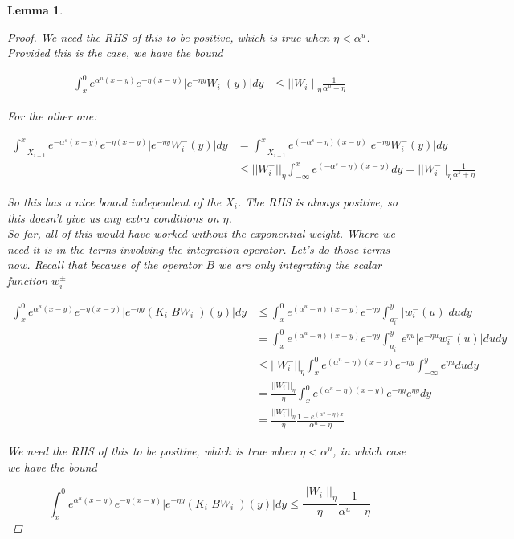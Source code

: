 \documentclass[12pt]{article}
\newtheorem{lemma}{Lemma}
\begin{document}
\begin{lemma}
\begin{proof}
We need the RHS of this to be positive, which is true when $\eta < \alpha^u$. Provided this is the case, we have the bound

\begin{align*}
\int_x^0 e^{\alpha^u (x-y)}e^{-\eta(x-y)}|e^{-\eta y} W_i^-(y)| dy &\leq ||W_i^-||_\eta \frac{1}{\alpha^u - \eta}
\end{align*}

For the other one:

\begin{align*}
\int_{-X_{i-1}}^x e^{-\alpha^s (x-y)}e^{-\eta(x-y)}|e^{-\eta y} W_i^-(y)| dy &= \int_{-X_{i-1}}^x e^{(-\alpha^s - \eta) (x-y)}|e^{-\eta y} W_i^-(y)| dy \\
&\leq ||W_i^-||_\eta \int_{-\infty}^x e^{(-\alpha^s - \eta) (x-y)} dy = ||W_i^-||_\eta \frac{1}{\alpha^s + \eta}
\end{align*}

So this has a nice bound independent of the $X_i$. The RHS is always positive, so this doesn't give us any extra conditions on $\eta$. \\

So far, all of this would have worked without the exponential weight. Where we need it is in the terms involving the integration operator. Let's do those terms now. Recall that because of the operator $B$ we are only integrating the scalar function $w_i^\pm$

\begin{align*}
\int_x^0 e^{\alpha^u (x-y)}e^{-\eta(x-y)}|e^{-\eta y} (K_i^- B W_i^-)(y)| dy &\leq \int_x^0 e^{(\alpha^u - \eta)(x-y)}e^{-\eta y} \int_{a_i^-}^y |w_i^-(u)| du dy \\
&= \int_x^0 e^{(\alpha^u - \eta)(x-y)}e^{-\eta y} \int_{a_i^-}^y e^{\eta u} |e^{-\eta u} w_i^-(u)| du dy \\
&\leq ||W_i^-||_\eta \int_x^0 e^{(\alpha^u - \eta)(x-y)}e^{-\eta y} \int_{-\infty}^y e^{\eta u} du dy \\
&= \frac{||W_i^-||_\eta}{\eta} \int_x^0 e^{(\alpha^u - \eta)(x-y)}e^{-\eta y} e^{\eta y} dy \\
&= \frac{||W_i^-||_\eta}{\eta} \frac{1 - e^{(\alpha^u - \eta)x}}{\alpha^u - \eta} 
\end{align*}

We need the RHS of this to be positive, which is true when $\eta < \alpha^u$, in which case we have the bound

\[
\int_x^0 e^{\alpha^u (x-y)}e^{-\eta(x-y)}|e^{-\eta y} (K_i^- B W_i^-)(y)| dy \leq 
\frac{||W_i^-||_\eta}{\eta} \frac{1}{\alpha^u - \eta} 
\]


\end{proof}
\end{lemma}
\end{document}
